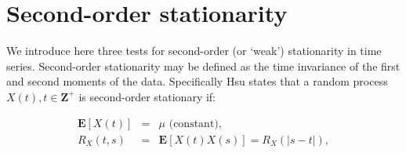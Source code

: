 

%

\section{Second-order stationarity}
\label{sec:stationarity}

We introduce here three tests for second-order (or `weak') stationarity in time series.  Second-order stationarity may be defined as the time invariance of the first and second moments of the data. Specifically Hsu \cite{hsu1997schaum} states that a random process $X(t), t \in \mathbf{Z}^+$ is second-order stationary if:

\begin{eqnarray*}
	\mathbf{E}[X(t)] &=& \mu \text{ (constant),} \\
	R_X(t,s) &=& \mathbf{E}[X(t)X(s)] = R_X(|s-t|), 
\end{eqnarray*}

